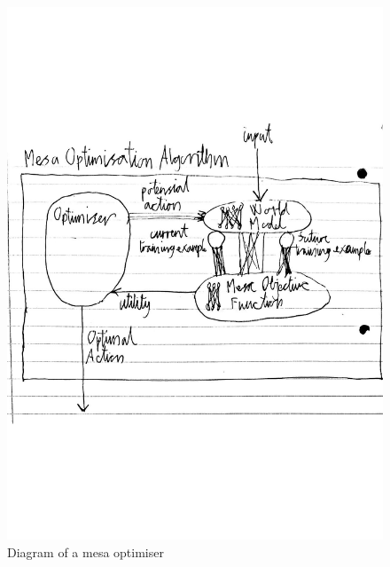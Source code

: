 \begin{figure}[htbp]
        \centering
        \includegraphics[width=\linewidth]{mesaoptdiagram}
        \caption{Diagram of a mesa optimiser}
        \label{fig:figure1}
    \end{figure}